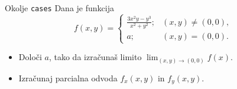 \begin{frame}{Okolje \texttt{cases}}
	Dana je funkcija
	$$
	f(x,y) = \begin{cases}
		\frac{3x^2y-y^3}{x^2+y^2}; & (x,y)\ne(0,0), \\
		a; & (x,y)=(0,0).
	\end{cases}
	$$
	\begin{itemize}
	\item Določi $a$, tako da izračunaš limito \( \lim_{(x,y)\to(0,0)} f(x). \)
	\item Izračunaj parcialna odvoda $f_x(x,y)$ in $f_y(x,y)$.
	\end{itemize}
\end{frame}
